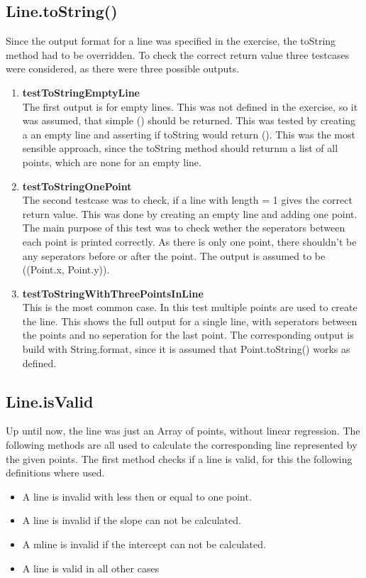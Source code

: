 \subsection{Line.toString()}
Since the output format for a line was specified in the exercise, the toString method had to be overridden. To check the correct return value three testcases were considered, as there were three possible outputs.
\begin{enumerate}
    \item \textbf{testToStringEmptyLine} \\
    The first output is for empty lines. This was not defined in the exercise, so it was assumed, that simple () should be returned. This was tested by creating a an empty line and asserting if toString would return (). This was the most sensible approach, since the toString method should returnm a list of all points, which are none for an empty line. 
    \item \textbf{testToStringOnePoint} \\
    The second testcase was to check, if a line with length = 1 gives the correct return value. This was done by creating an empty line and adding one point. The main purpose of this test was to check wether the seperators between each point is printed correctly. As there is only one point, there shouldn't be any seperators before or after the point. The output is assumed to be ((Point.x, Point.y)).
    \item \textbf{testToStringWithThreePointsInLine} \\
    This is the most common case. In this test multiple points are used to create the line. This shows the full output for a single line, with seperators between the points and no seperation for the last point. The corresponding output is build with String.format, since it is assumed that Point.toString() works as defined.
\end{enumerate}

\subsection{Line.isValid}
Up until now, the line was just an Array of points, without linear regression. The following methods are all used to calculate the corresponding line represented by the given points. The first method checks if a line is valid, for this the following  definitions where used.

\begin{itemize}
    \item A line is invalid with less then or equal to one point.
    \item A line is invalid if the slope can not be calculated.
    \item A mline is invalid if the intercept can not be calculated.
    \item A line is valid in all other cases
\end{itemize}


